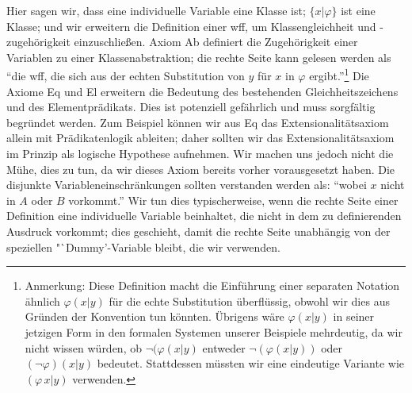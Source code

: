 Hier sagen wir, dass eine individuelle Variable eine Klasse ist; $\{x|\varphi\}$ ist eine Klasse; und wir erweitern die Definition einer wff, um Klassengleichheit und -zugehörigkeit einzuschließen.  Axiom Ab definiert die Zugehörigkeit einer Variablen zu einer Klassenabstraktion; die rechte Seite kann gelesen werden als "`die wff, die sich aus der echten Substitution von $y$ für $x$ in $\varphi$ ergibt."'\footnote{Anmerkung: Diese Definition macht die Einführung einer separaten Notation ähnlich $\varphi(x|y)$ für die echte Substitution überflüssig, obwohl wir dies aus Gründen der Konvention tun könnten.  Übrigens wäre $\varphi(x|y)$ in seiner jetzigen Form in den formalen Systemen unserer Beispiele mehrdeutig, da wir nicht wissen würden, ob $\lnot(\varphi(x|y)$ entweder $\lnot(\varphi(x|y))$ oder $(\lnot\varphi)(x|y)$ bedeutet. Stattdessen müssten wir eine eindeutige Variante wie $(\varphi\, x|y)$ verwenden.}  Die Axiome Eq und El erweitern die Bedeutung des bestehenden Gleichheitszeichens und des Elementprädikats.  Dies ist potenziell gefährlich und muss sorgfältig begründet werden.  Zum Beispiel können wir aus Eq das Extensionalitätsaxiom allein mit Prädikatenlogik ableiten; daher sollten wir das Extensionalitätsaxiom im Prinzip als logische Hypothese aufnehmen.  Wir machen uns jedoch nicht die Mühe, dies zu tun, da wir dieses Axiom bereits vorher vorausgesetzt haben. Die disjunkte Variableneinschränkungen sollten verstanden werden als: "`wobei $x$ nicht in $A$ oder $B$ vorkommt."'  Wir tun dies typischerweise, wenn die rechte Seite einer Definition eine individuelle Variable beinhaltet, die nicht in dem zu definierenden Ausdruck vorkommt; dies geschieht, damit die rechte Seite unabhängig von der speziellen "`Dummy'-Variable bleibt, die wir verwenden. 

